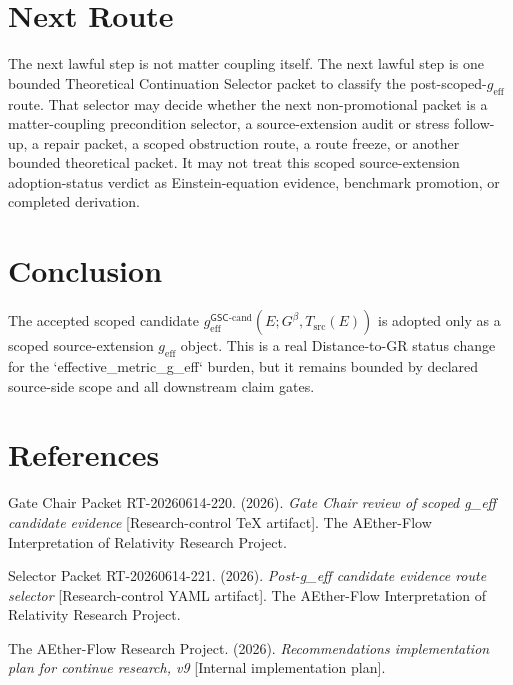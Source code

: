 \documentclass[11pt]{article}
\newcommand{\Gbeta}{G^\beta}
\newcommand{\geff}{g_{\mathrm{eff}}}
\newcommand{\geffCand}{g_{\mathrm{eff}}^{\mathsf{GSC}\mbox{-}\mathrm{cand}}}
\begin{document}
\section{Next Route}

The next lawful step is not matter coupling itself. The next lawful step is one
bounded Theoretical Continuation Selector packet to classify the
post-scoped-\(\geff\) route. That selector may decide whether the next
non-promotional packet is a matter-coupling precondition selector, a
source-extension audit or stress follow-up, a repair packet, a scoped
obstruction route, a route freeze, or another bounded theoretical packet. It
may not treat this scoped source-extension adoption-status verdict as
Einstein-equation evidence, benchmark promotion, or completed derivation.

\section{Conclusion}

The accepted scoped candidate \(\geffCand(E;\Gbeta,T_{\mathrm{src}}(E))\) is
adopted only as a scoped source-extension \(\geff\) object. This is a real
Distance-to-GR status change for the `effective\_metric\_g\_eff` burden, but
it remains bounded by declared source-side scope and all downstream claim
gates.

\section{References}

Gate Chair Packet RT-20260614-220. (2026). \emph{Gate Chair review of scoped
g\_eff candidate evidence} [Research-control TeX artifact]. The AEther-Flow
Interpretation of Relativity Research Project.

Selector Packet RT-20260614-221. (2026). \emph{Post-g\_eff candidate evidence
route selector} [Research-control YAML artifact]. The AEther-Flow
Interpretation of Relativity Research Project.

The AEther-Flow Research Project. (2026). \emph{Recommendations implementation
plan for continue research, v9} [Internal implementation plan].
\end{document}
